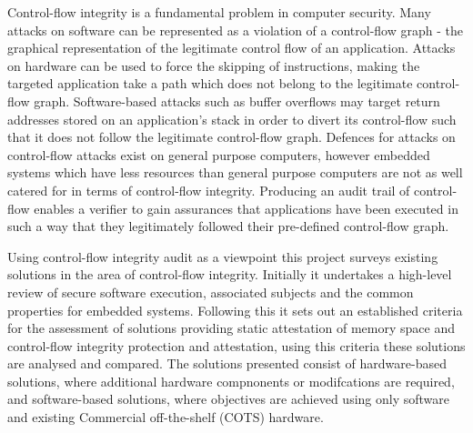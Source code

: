 Control-flow integrity is a fundamental problem in computer security. Many attacks on software can be represented as a violation of a control-flow graph - the graphical representation of the legitimate control flow of an application. Attacks on hardware can be used to force the skipping of instructions, making the targeted application take a path which does not belong to the legitimate control-flow graph. Software-based attacks such as buffer overflows may target return addresses stored on an application's stack in order to divert its control-flow such that it does not follow the legitimate control-flow graph. Defences for attacks on control-flow attacks exist on general purpose computers, however embedded systems which have less resources than general purpose computers are not as well catered for in terms of control-flow integrity. Producing an audit trail of control-flow enables a verifier to gain assurances that applications have been executed in such a way that they legitimately followed their pre-defined control-flow graph.

Using control-flow integrity audit as a viewpoint this project surveys existing solutions in the area of control-flow integrity. Initially it undertakes a high-level review of secure software execution, associated subjects and the common properties for embedded systems. Following this it sets out an established criteria for the assessment of solutions providing static attestation of memory space and control-flow integrity protection and attestation, using this criteria these solutions are analysed and compared. The solutions presented consist of hardware-based solutions, where additional hardware compnonents or modifcations are required, and software-based solutions, where objectives are achieved using only software and existing Commercial off-the-shelf (COTS) hardware.
